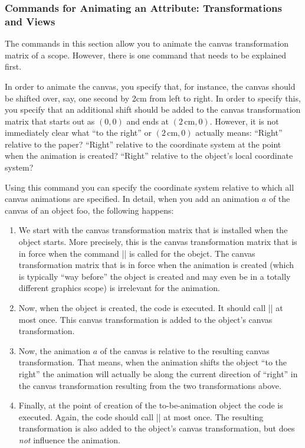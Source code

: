 \subsubsection{Commands for Animating an Attribute: Transformations  and Views}

The commands in this section allow you to animate the canvas
transformation matrix of a scope. However, there is one command that
needs to be explained first.

\begin{command}{\pgfsys@animation@canvas@transform{}}
  In order to animate the canvas, you specify that, for instance, the
  canvas should be shifted over, say, one second by 2cm from left to
  right. In order to specify this, you specify that an additional
  shift should be added to the canvas transformation matrix that
  starts out as $(0,0)$ and ends at $(2\,\mathrm{cm},0)$. However, it
  is not immediately clear what ``to the right'' or
  $(2\,\mathrm{cm},0)$ actually means: ``Right'' relative to the
  paper? ``Right'' relative to the coordinate system at the point when the
  animation is created? ``Right'' relative to the object's local
  coordinate system?

  Using this command you can specify the coordinate system relative to
  which all canvas animations are specified. In detail, when you
  add an animation $a$ of the canvas of an object foo, the following
  happens: 

  \begin{enumerate}
  \item We start with the canvas transformation matrix that is
    installed when the object starts. More precisely, this is the
    canvas transformation matrix that is in force when the command
    |\pgfsys@begin@idscope| is called for the obejct. The canvas
    transformation matrix that is in force when the animation is
    created (which is typically ``way before'' the object is created
    and may even be in a totally different graphics scope) is
    irrelevant for the animation.
  \item Now, when the object is created, the code  is
    executed. It should call |\pgfsys@transformcm| at most once. This
    canvas transformation is added to the object's canvas
    transformation.
  \item Now, the animation $a$ of the canvas is relative to the
    resulting canvas transformation. That means, when the animation
    shifts the object ``to the right'' the animation will actually be
    along the current direction of ``right'' in the canvas
    transformation resulting from the two transformations above.
  \item Finally, at the point of creation of the to-be-animation
    object the code  is executed. Again, the code
    should call |\pgfsys@transformcm| at most once. The resulting
    transformation is also added to the object's canvas
    transformation, but does \emph{not} influence the animation.
  \end{enumerate}


\end{command}
